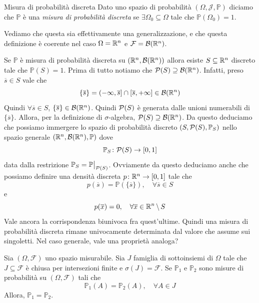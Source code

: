 \documentclass[a4paper]{article}
\begin{document}
\begin{snippetdefinition}{Misura di probabilità discreta}
    Dato uno spazio di probabilità
    \((\Omega, \mathcal J, \mathbb P)\) diciamo che \(\mathbb P\) è una
    \emph{misura di probabilità discreta}
    se \(\exists \Omega_0 \subseteq \Omega\)
    tale che \(\mathbb P(\Omega_0) = 1\).
\end{snippetdefinition}

Vediamo che questa sia effettivamente una generalizzazione,
e che questa definizione è coerente nel caso \(\Omega = \mathbb{R}^n\)
e \(\mathcal F = \mathcal B(\mathbb{R}^n)\).

Se \(\mathbb P\) è misura di probabilità discreta su \((\mathbb{R}^n, \mathcal B(\mathbb{R}^n))\)
allora esiste \(S \subseteq \mathbb{R}^n\) discreto tale che
\(\mathbb P(S) = 1\).
Prima di tutto notiamo che \(\mathcal P(S) \supseteq \mathcal B(\mathbb{R}^n)\).
Infatti, preso \(\overline s \in S\) vale che
\[
    \{\overline s\} = (-\infty,\overline s]
    \cap [\overline s, +\infty] \in \mathcal B(\mathbb{R}^n)
\]
Quindi \(\forall \overline s \in S\), \(\{\overline s\} \in \mathcal B(\mathbb{R}^n)\).
Quindi \(\mathcal P(S)\) è generata dalle unioni numerabili di \(\{\overline s\}\).
Allora, per la definizione di \(\sigma\)-algebra, \(\mathcal P(S) \supseteq \mathcal B(\mathbb{R}^n)\).
Da questo deduciamo che possiamo immergere lo spazio di probabilità discreto
\((S, \mathcal P(S), \mathbb P_S)\) nello spazio generale
\((\mathbb{R}^n, \mathcal B(\mathbb{R}^n), \mathbb P)\)
dove \[
    \mathbb P_S \colon \mathcal P(S) \to [0,1]
\]
data dalla restrizione \(\mathbb P_S = \restr{\mathbb P}{\powerset(S)}\).
Ovviamente da questo deduciamo anche che possiamo definire una densità discreta
\(p \colon \mathbb{R}^n \to [0,1]\) tale che
\[
    p(\overline s) = \mathbb P(\{\overline s\}),
    \quad \forall \overline s \in S
\]
e \[
    p(\overline x) = 0,
    \quad \forall \overline x \in \mathbb{R}^n \,\backslash\, S
\]
Vale ancora la corrispondenza
biunivoca fra quest'ultime.
Quindi una misura di probabilità discreta rimane univocamente determinata dal valore
che assume sui singoletti.
Nel caso generale, vale una proprietà analoga?

\begin{snippetlemma}{}
    Sia \((\Omega, \mathcal F)\) uno spazio misurabile.
    Sia \(J\) famiglia di sottoinsiemi di \(\Omega\)
    tale che \(J \subseteq \mathcal F\)
    è chiusa per intersezioni finite e \(\sigma(J) = \mathcal F\).
    Se \(\mathbb P_1\) e \(\mathbb P_2\) sono misure di probabilità
    su \((\Omega, \mathcal F)\) tali che
    \[
        \mathbb P_1(A) = \mathbb P_2(A), \quad \forall A \in J
    \]
    Allora, \(\mathbb P_1 = \mathbb P_2\).
\end{snippetlemma}
\end{document}
